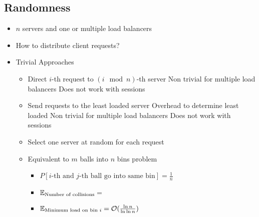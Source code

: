 \subsection{Randomness}
\begin{itemize}
        \begin{itemize}
            \item $n$ servers and one or multiple load balancers
            \item How to distribute client requests?
            \item Trivial Approaches
                \begin{itemize}
                        \begin{itemize}
                            \item Direct $i$-th request to $(i \mod n)$-th server
                            \icon Non trivial for multiple load balancers
                            \icon Does not work with sessions
                        \end{itemize}
                        \begin{itemize}
                            \item Send requests to the least loaded server
                            \icon Overhead to determine least loaded
                            \icon Non trivial for multiple load balancers
                            \icon Does not work with sessions
                        \end{itemize}
                 \end{itemize}
                \begin{itemize}
                    \item Select one server at random for each request
                    \item Equivalent to $m$ balls into $n$ bins problem
                        \begin{itemize}
                            \item $P[i \text{-th and } j \text{-th ball go into same bin}] = \frac{1}{n}$
                            \item $\mathbb{E}_{\text{Number of collisions}} =$
                            \item $\mathbb{E}_{\text{Minimum load on bin } i} = \mathcal{O}(\frac{\ln n}{\ln \ln n})$


\end{itemize}
\end{itemize}
\end{itemize}
\end{itemize}
